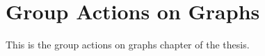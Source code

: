 
\chapter{Group Actions on Graphs}\label{ch:group_actions}

This is the group actions on graphs chapter of the thesis.

%

%
%
%